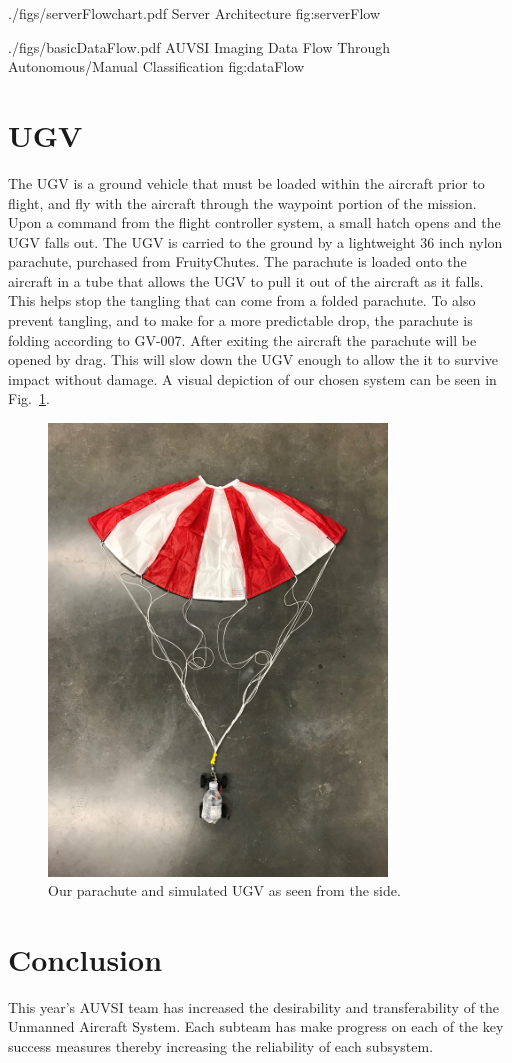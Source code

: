\documentclass[]{auvsi_doc}
\begin{document}
\AUVSIFigure
{./figs/serverFlowchart.pdf}
{\textwidth}
{Server Architecture}
{fig:serverFlow}


\AUVSIFigure
{./figs/basicDataFlow.pdf}
{\textwidth}
{AUVSI Imaging Data Flow Through Autonomous/Manual Classification}
{fig:dataFlow}


\section{UGV}

The UGV is a ground vehicle that must be loaded within the aircraft prior to flight, and fly with the aircraft through the waypoint portion of the mission. 
Upon a command from the flight controller system, a small hatch opens and the UGV falls out.
The UGV is carried to the ground by a lightweight 36 inch nylon parachute, purchased from FruityChutes.
The parachute is loaded onto the aircraft in a tube that allows the UGV to pull it out of the aircraft as it falls.
This helps stop the tangling that can come from a folded parachute.
To also prevent tangling, and to make for a more predictable drop, the parachute is folding according to GV-007.
After exiting the aircraft the parachute will be opened by drag.
This will slow down the UGV enough to allow the it to survive impact without damage.
A visual depiction of our chosen system can be seen in Fig.~\ref{fig:side}.

\begin{figure}[h]
\centering
\includegraphics[width=90mm]{./figs/Parachute_Side.jpg}
\caption{Our parachute and simulated UGV as seen from the side.}
\label{fig:side}
\end{figure}

\section{Conclusion}

This year's AUVSI team has increased the desirability and transferability of the Unmanned Aircraft System. Each subteam
has make progress on each of the key success measures thereby increasing the reliability of each subsystem.
\end{document}
